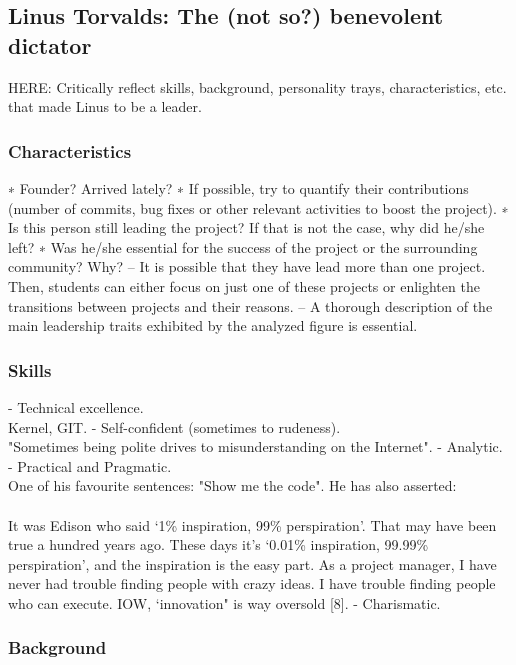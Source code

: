 \documentclass[11pt]{article}
\begin{document}
\subsection{Linus Torvalds: The (not so?) benevolent dictator}
HERE: Critically reflect skills, background, personality trays, characteristics, etc. that made Linus to be a leader.

\subsubsection{Characteristics}
∗ Founder? Arrived lately?
∗ If possible, try to quantify their contributions (number of commits, bug fixes or other relevant activities to boost the project).
∗ Is this person still leading the project? If that is not the case, why did he/she left?
∗ Was he/she essential for the success of the project or the surrounding community?
Why?
– It is possible that they have lead more than one project. Then, students can either
focus on just one of these projects or enlighten the transitions between projects and
their reasons.
– A thorough description of the main leadership traits exhibited by the analyzed figure
is essential.

\subsubsection{Skills}
- Technical excellence.\\
Kernel, GIT.
- Self-confident (sometimes to rudeness).\\
"Sometimes being polite drives to misunderstanding on the Internet".
- Analytic.\\
- Practical and Pragmatic.\\
One of his favourite sentences: "Show me the code". He has also asserted:\\
\\
It was Edison who said ‘1\% inspiration, 99\% perspiration’. That may have been true a hundred years ago. These days it's ‘0.01\% inspiration, 99.99\% perspiration’, and the inspiration is the easy part. As a project manager, I have never had trouble finding people with crazy ideas. I have trouble finding people who can execute.  IOW, ‘innovation" is way oversold [8].
- Charismatic.\\

\subsubsection{Background}
\end{document}
